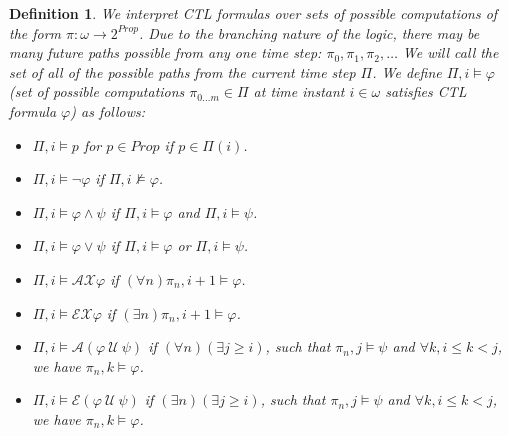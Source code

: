 \documentclass{elsarticle} %
\newtheorem{defin}{Definition}
\renewcommand{\phi}{\varphi}
\begin{document}
\begin{defin}\label{CTL_Semantics} %
We interpret CTL formulas over sets of possible computations of the form $\pi : \omega \rightarrow 2^{Prop}$. 
Due to the branching nature of the logic, there may be many future paths possible from any one time step: $\pi_0, \pi_1, \pi_2, \ldots$ We will call the set of all of the possible paths from the current time step $\Pi$. 
We define $\Pi, i \vDash \phi$ (set of possible computations $\pi_{0 \ldots m} \in \Pi$ at time instant $i \in \omega$ satisfies CTL formula $\phi$) as follows:
\begin{itemize}
\item $\Pi, i \vDash p$ for $p \in Prop$ if $p \in \Pi(i)$.
\item $\Pi, i \vDash \neg \phi$ if $\Pi, i \nvDash \phi$.
\item $\Pi, i \vDash \phi \wedge \psi$ if $\Pi, i \vDash \phi$ and $\Pi, i \vDash \psi$.
\item $\Pi, i \vDash \phi \vee \psi$ if $\Pi, i \vDash \phi$ or $\Pi, i \vDash \psi$.

\item $\Pi, i \vDash \mathcal{AX} \phi$ if $(\forall n) \pi_n, i+1 \vDash \phi$.
\item $\Pi, i \vDash \mathcal{EX} \phi$ if $(\exists n) \pi_n, i+1 \vDash \phi$.

\item $\Pi, i \vDash \mathcal{A}(\phi \ \mathcal{U} \ \psi)$ if $(\forall n)(\exists j \ge i)$, such that $\pi_n, j \vDash \psi$ and $ \forall k, i \le k < j$, we have $\pi_n, k \vDash \phi$.
\item $\Pi, i \vDash \mathcal{E}(\phi \ \mathcal{U} \ \psi)$ if $(\exists n)(\exists j \ge i)$, such that $\pi_n, j \vDash \psi$ and $ \forall k, i \le k < j$, we have $\pi_n, k \vDash \phi$.



\end{itemize}
\end{defin}
\end{document}
